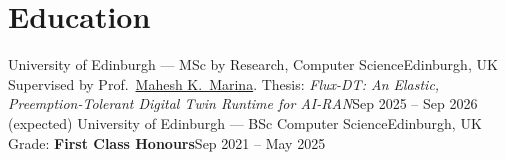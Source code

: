\section{Education}
  \resumeSubHeadingListStart
    \resumeSubheading
      {University of Edinburgh --- MSc by Research, Computer Science}{Edinburgh, UK}
      {Supervised by Prof.\ \href{https://homepages.inf.ed.ac.uk/mmarina/}{Mahesh K.\ Marina}. Thesis: \textit{Flux-DT: An Elastic, Preemption-Tolerant Digital Twin Runtime for AI-RAN}}{Sep 2025 -- Sep 2026 (expected)}
    \resumeSubheading
      {University of Edinburgh --- BSc Computer Science}{Edinburgh, UK}
      {Grade: \textbf{First Class Honours}}{Sep 2021 -- May 2025}
      \resumeItemListStart
      \resumeItemListEnd
  \resumeSubHeadingListEnd
